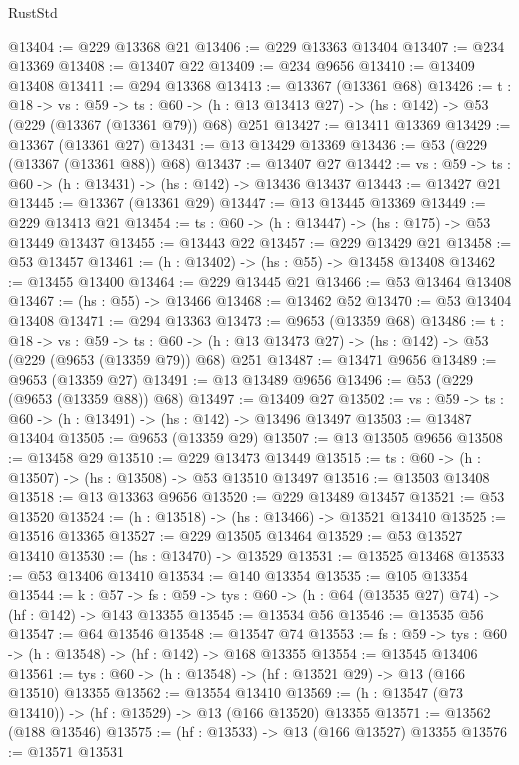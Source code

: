 \begin{lexlean}{RustStd}
\begin{coremodule}
@13404 := @229 @13368 @21
@13406 := @229 @13363 @13404
@13407 := @234 @13369
@13408 := @13407 @22
@13409 := @234 @9656
@13410 := @13409 @13408
@13411 := @294 @13368
@13413 := @13367 (@13361 @68)
@13426 := {t : @18} ->
  {vs : @59} ->
  {ts : @60} -> (h : @13 @13413 @27) -> (hs : @142) -> @53 (@229 (@13367 (@13361 @79)) @68) @251
@13427 := @13411 @13369
@13429 := @13367 (@13361 @27)
@13431 := @13 @13429 @13369
@13436 := @53 (@229 (@13367 (@13361 @88)) @68)
@13437 := @13407 @27
@13442 := {vs : @59} -> {ts : @60} -> (h : @13431) -> (hs : @142) -> @13436 @13437
@13443 := @13427 @21
@13445 := @13367 (@13361 @29)
@13447 := @13 @13445 @13369
@13449 := @229 @13413 @21
@13454 := {ts : @60} -> (h : @13447) -> (hs : @175) -> @53 @13449 @13437
@13455 := @13443 @22
@13457 := @229 @13429 @21
@13458 := @53 @13457
@13461 := (h : @13402) -> (hs : @55) -> @13458 @13408
@13462 := @13455 @13400
@13464 := @229 @13445 @21
@13466 := @53 @13464 @13408
@13467 := (hs : @55) -> @13466
@13468 := @13462 @52
@13470 := @53 @13404 @13408
@13471 := @294 @13363
@13473 := @9653 (@13359 @68)
@13486 := {t : @18} ->
  {vs : @59} ->
  {ts : @60} -> (h : @13 @13473 @27) -> (hs : @142) -> @53 (@229 (@9653 (@13359 @79)) @68) @251
@13487 := @13471 @9656
@13489 := @9653 (@13359 @27)
@13491 := @13 @13489 @9656
@13496 := @53 (@229 (@9653 (@13359 @88)) @68)
@13497 := @13409 @27
@13502 := {vs : @59} -> {ts : @60} -> (h : @13491) -> (hs : @142) -> @13496 @13497
@13503 := @13487 @13404
@13505 := @9653 (@13359 @29)
@13507 := @13 @13505 @9656
@13508 := @13458 @29
@13510 := @229 @13473 @13449
@13515 := {ts : @60} -> (h : @13507) -> (hs : @13508) -> @53 @13510 @13497
@13516 := @13503 @13408
@13518 := @13 @13363 @9656
@13520 := @229 @13489 @13457
@13521 := @53 @13520
@13524 := (h : @13518) -> (hs : @13466) -> @13521 @13410
@13525 := @13516 @13365
@13527 := @229 @13505 @13464
@13529 := @53 @13527 @13410
@13530 := (hs : @13470) -> @13529
@13531 := @13525 @13468
@13533 := @53 @13406 @13410
@13534 := @140 @13354
@13535 := @105 @13354
@13544 := {k : @57} ->
  {fs : @59} -> {tys : @60} -> (h : @64 (@13535 @27) @74) -> (hf : @142) -> @143 @13355
@13545 := @13534 @56
@13546 := @13535 @56
@13547 := @64 @13546
@13548 := @13547 @74
@13553 := {fs : @59} -> {tys : @60} -> (h : @13548) -> (hf : @142) -> @168 @13355
@13554 := @13545 @13406
@13561 := {tys : @60} -> (h : @13548) -> (hf : @13521 @29) -> @13 (@166 @13510) @13355
@13562 := @13554 @13410
@13569 := (h : @13547 (@73 @13410)) -> (hf : @13529) -> @13 (@166 @13520) @13355
@13571 := @13562 (@188 @13546)
@13575 := (hf : @13533) -> @13 (@166 @13527) @13355
@13576 := @13571 @13531

\end{coremodule}
\end{lexlean}
